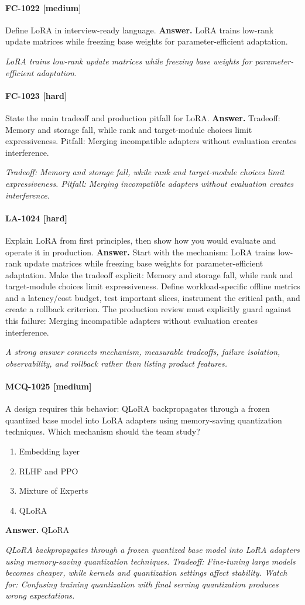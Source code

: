 \paragraph{FC-1022 [medium]} Define LoRA in interview-ready language.
\noindent\textbf{Answer.} LoRA trains low-rank update matrices while freezing base weights for parameter-efficient adaptation.
\par\textit{LoRA trains low-rank update matrices while freezing base weights for parameter-efficient adaptation.}
\paragraph{FC-1023 [hard]} State the main tradeoff and production pitfall for LoRA.
\noindent\textbf{Answer.} Tradeoff: Memory and storage fall, while rank and target-module choices limit expressiveness. Pitfall: Merging incompatible adapters without evaluation creates interference.
\par\textit{Tradeoff: Memory and storage fall, while rank and target-module choices limit expressiveness. Pitfall: Merging incompatible adapters without evaluation creates interference.}
\paragraph{LA-1024 [hard]} Explain LoRA from first principles, then show how you would evaluate and operate it in production.
\noindent\textbf{Answer.} Start with the mechanism: LoRA trains low-rank update matrices while freezing base weights for parameter-efficient adaptation. Make the tradeoff explicit: Memory and storage fall, while rank and target-module choices limit expressiveness. Define workload-specific offline metrics and a latency/cost budget, test important slices, instrument the critical path, and create a rollback criterion. The production review must explicitly guard against this failure: Merging incompatible adapters without evaluation creates interference.
\par\textit{A strong answer connects mechanism, measurable tradeoffs, failure isolation, observability, and rollback rather than listing product features.}
\paragraph{MCQ-1025 [medium]} A design requires this behavior: QLoRA backpropagates through a frozen quantized base model into LoRA adapters using memory-saving quantization techniques. Which mechanism should the team study?
\begin{enumerate}[label=\Alph*.]
\item Embedding layer
\item RLHF and PPO
\item Mixture of Experts
\item QLoRA
\end{enumerate}
\noindent\textbf{Answer.} QLoRA
\par\textit{QLoRA backpropagates through a frozen quantized base model into LoRA adapters using memory-saving quantization techniques. Tradeoff: Fine-tuning large models becomes cheaper, while kernels and quantization settings affect stability. Watch for: Confusing training quantization with final serving quantization produces wrong expectations.}
